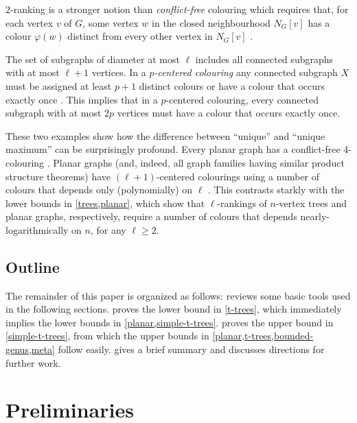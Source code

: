 \documentclass[kpfonts]{patmorin}
\theoremstyle{named}
\begin{document}
$2$-ranking is a stronger notion than \emph{conflict-free} colouring which requires that, for each vertex $v$ of $G$, some vertex $w$ in the closed neighbourhood $N_G[v]$ has a colour $\varphi(w)$ distinct from every other vertex in $N_G[v]$ \cite{pach.tardos:conflict-free,glebov.szabo.ea:conflict-free,gargano.rescigno:complexity}.

The set of subgraphs of diameter at most $\ell$ includes all connected subgraphs with at most $\ell+1$ vertices.  In a \emph{$p$-centered colouring} any connected subgraph $X$ must be assigned at least $p+1$ distinct colours or have a colour that occurs exactly once \cite{nesetril.ossona:tree-depth,nesetril.ossona:grad,zhu:colouring}.  This implies that in a $p$-centered colouring, every connected subgraph with at most $2p$ vertices must have a colour that occurs exactly once.

These two examples show how the difference between ``unique'' and ``unique maximum'' can be surprisingly profound.  Every planar graph has a conflict-free 4-colouring \cite{abel.alvarez.ea:conflict-free}. Planar graphs (and, indeed, all graph families having similar product structure theorems) have $(\ell+1)$-centered colourings using a number of colours that depends only (polynomially) on $\ell$ \cite{nesetril.ossona:grad,debski.felsner.ea:improved,pilipczuk.siebertz:polynomial}.  This contrasts starkly with the lower bounds in \cref{trees,planar}, which show that $\ell$-rankings of $n$-vertex trees and planar graphs, respectively, require a number of colours that depends nearly-logarithmically on $n$, for any $\ell\ge 2$.

\subsection{Outline}

The remainder of this paper is organized as follows:  reviews some basic tools used in the following sections.    proves the lower bound in \cref{t-trees}, which immediately implies the lower bounds in \cref{planar,simple-t-trees}.  proves the upper bound in \cref{simple-t-trees}, from which the upper bounds in \cref{planar,t-trees,bounded-genus,meta} follow easily.   gives a brief summary and discusses directions for further work.

\section{Preliminaries}
\end{document}
